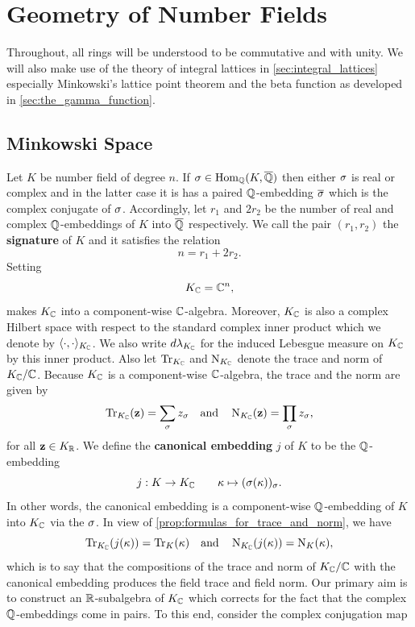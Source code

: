 \chapter{Geometry of Number Fields}
  Throughout, all rings will be understood to be commutative and with unity. We will also make use of the theory of integral lattices in \cref{sec:integral_lattices} especially Minkowski's lattice point theorem and the beta function as developed in \cref{sec:the_gamma_function}.
  \section{Minkowski Space}
    Let \(K\) be number field of degree \(n\). If \(\sigma \in \operatorname{\mathrm{Hom}}_{\mathbb{Q}}(K,\overline{\mathbb{Q}})\) then either \(\sigma\) is real or complex and in the latter case it is has a paired \(\mathbb{Q}\)-embedding \(\overline{\sigma}\) which is the complex conjugate of \(\sigma\). Accordingly, let \(r_{1}\) and \(2r_{2}\) be the number of real and complex \(\mathbb{Q}\)-embeddings of \(K\) into \(\overline{\mathbb{Q}}\) respectively. We call the pair \((r_{1},r_{2})\) the \textbf{signature} of \(K\) and it satisfies the relation
    \[
      n = r_{1}+2r_{2}.
    \]
    Setting
    \[
      K_{\mathbb{C}} = \mathbb{C}^{n},
    \]
    makes \(K_{\mathbb{C}}\) into a component-wise \(\mathbb{C}\)-algebra. Moreover, \(K_{\mathbb{C}}\) is also a complex Hilbert space with respect to the standard complex inner product which we denote by \(\langle\cdot,\cdot\rangle_{K_{\mathbb{C}}}\). We also write \(d\lambda_{K_{\mathbb{C}}}\) for the induced Lebesgue measure on \(K_{\mathbb{C}}\) by this inner product. Also let \(\operatorname{\mathrm{Tr}}_{K_{\mathbb{C}}}\) and \(\operatorname{\mathrm{N}}_{K_{\mathbb{C}}}\) denote the trace and norm of \(K_{\mathbb{C}}/\mathbb{C}\). Because \(K_{\mathbb{C}}\) is a component-wise \(\mathbb{C}\)-algebra, the trace and the norm are given by
    \[
      \operatorname{\mathrm{Tr}}_{K_{\mathbb{C}}}(\mathbf{z}) = \sum_{\sigma}z_{\sigma} \quad \text{and} \quad \operatorname{\mathrm{N}}_{K_{\mathbb{C}}}(\mathbf{z}) = \prod_{\sigma}z_{\sigma},
    \]
    for all \(\mathbf{z} \in K_{\mathbb{R}}\). We define the \textbf{canonical embedding} \(j\) of \(K\) to be the \(\mathbb{Q}\)-embedding
    \[
      j:K \to K_{\mathbb{C}} \qquad \kappa \mapsto (\sigma(\kappa))_{\sigma}.
    \]
    In other words, the canonical embedding is a component-wise \(\mathbb{Q}\)-embedding of \(K\) into \(K_{\mathbb{C}}\) via the \(\sigma\). In view of \cref{prop:formulas_for_trace_and_norm}, we have
    \[
      \operatorname{\mathrm{Tr}}_{K_{\mathbb{C}}}(j(\kappa)) = \operatorname{\mathrm{Tr}}_{K}(\kappa) \quad \text{and} \quad \operatorname{\mathrm{N}}_{K_{\mathbb{C}}}(j(\kappa)) = \operatorname{\mathrm{N}}_{K}(\kappa),
    \]
    which is to say that the compositions of the trace and norm of \(K_{\mathbb{C}}/\mathbb{C}\) with the canonical embedding produces the field trace and field norm. Our primary aim is to construct an \(\mathbb{R}\)-subalgebra of \(K_{\mathbb{C}}\) which corrects for the fact that the complex \(\mathbb{Q}\)-embeddings come in pairs. To this end, consider the complex conjugation map
